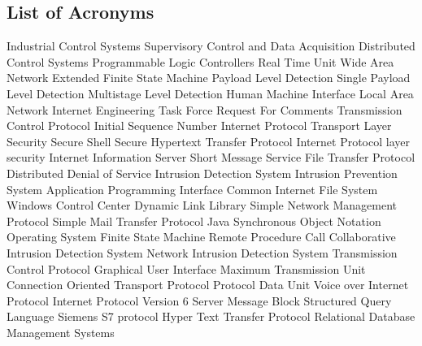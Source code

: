 \documentclass[article,msc=informatik,type=msc,colorback,accentcolor=tud9c]{tudthesis}
\begin{document}
  	
  	\newpage
  	\begin{appendix}
  	  \listoffigures
  	  \newpage
  	   	\listoftables
  	    	  \newpage
  	  \lstlistoflistings
  	  
  	  \newpage
  	  
  	  	\section{List of Acronyms}
  	    \begin {acronym} [include-classes=abbrev,name=Abbreviations]
  	       {Industrial Control Systems}
  	       {Supervisory Control and Data Acquisition}
  	       {Distributed Control Systems}
  	       {Programmable Logic Controllers}
  	       {Real Time Unit}
  	       {Wide Area Network}
  	       {Extended Finite State Machine}
  	       {Payload Level Detection}
  	       {Single Payload Level Detection}
  	       {Multistage Level Detection}
  	       {Human Machine Interface}
  	       {Local Area Network}
  	       {Internet Engineering Task Force}
  	       {Request For Comments}
  	       {Transmission Control Protocol}
  	       {Initial Sequence Number}
  	       {Internet Protocol}
  	       {Transport Layer Security}
  	       {Secure Shell}
  	       {Secure Hypertext Transfer Protocol}
  	       {Internet Protocol layer security}
  	       {Internet Information Server}
  	       {Short Message Service}
  	       {File Transfer Protocol}
  	       {Distributed Denial of Service}
  	       {Intrusion Detection System}
  	       {Intrusion Prevention System}
  	       {Application Programming Interface}
  	       {Common Internet File System}
  	       {Windows Control Center}
  	      	{Dynamic Link Library}
  	       {Simple Network Management Protocol}
  	       {Simple Mail Transfer Protocol}
  	       {Java Synchronous Object Notation}
  	       {Operating System}
  	       {Finite State Machine}
  	       {Remote Procedure Call}
  	       {Collaborative Intrusion Detection System}
  	       {Network Intrusion Detection System}
  	       {Transmission Control Protocol}
  	       {Graphical User Interface}
  	       {Maximum Transmission Unit}
  	       {Connection Oriented Transport Protocol}
  	       {Protocol Data Unit}
  	       {Voice over Internet Protocol} 
  	       {Internet Protocol Version 6}
  	       {Server Message Block}
  	       {Structured Query Language}
  	       {Siemens S7 protocol}
  	       {Hyper Text Transfer Protocol}
  	       {Relational Database Management Systems}
  	      \end{acronym}
  	      

\end{appendix}
\end{document}
